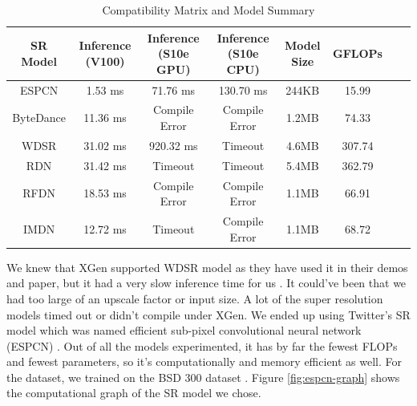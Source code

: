 \documentclass{article}
\begin{document}
\begin{table}[ht]
\caption{Compatibility Matrix and Model Summary} %
\centering %
\begin{tabular}{c c c c c c c c } %
\hline\hline %
SR Model & Inference (V100) & Inference (S10e GPU) & Inference (S10e CPU) & Model Size & GFLOPs \\ [0.5ex] %
\hline %
ESPCN \cite{twitter-superresolution}  & 1.53 ms  & 71.76 ms      & 130.70 ms     & 244KB & 15.99 \\
ByteDance \cite{ntire22}              &	11.36 ms & Compile Error & Compile Error & 1.2MB & 74.33 \\
WDSR \cite{wdsr}                      &	31.02 ms & 920.32 ms     & Timeout       & 4.6MB & 307.74 \\
RDN \cite{rdn}	                      & 31.42 ms & Timeout       & Timeout       & 5.4MB & 362.79 \\
RFDN \cite{ntire22}                   & 18.53 ms & Compile Error & Compile Error & 1.1MB & 66.91 \\
IMDN \cite{ntire22}                   & 12.72 ms & Timeout       & Compile Error & 1.1MB & 68.72 \\
[1ex] %
\hline %
\end{tabular}
\label{table:summary} %
\end{table}


We knew that XGen supported WDSR model as they have used it in their demos and paper, but it had a very slow inference time for us \cite{cocopie-xgen}. It could've been that we had too large of an upscale factor or input size. A lot of the super resolution models timed out or didn't compile under XGen. We ended up using Twitter's SR model which was named efficient sub-pixel convolutional neural network (ESPCN) \cite{twitter-superresolution}. Out of all the models experimented, it has by far the fewest FLOPs and fewest parameters, so it's computationally and memory efficient as well. For the dataset, we trained on the BSD 300 dataset \cite{bsd}. Figure \ref{fig:espcn-graph} shows the computational graph of the SR model we chose.
\end{document}
